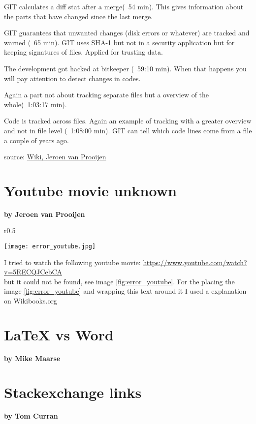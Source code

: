 GIT calculates a diff stat after a merge(~54 min). This gives information about the parts 
that have changed since the last merge.

GIT guarantees that unwanted changes (disk errors or whatever) are tracked and warned 
(~65 min). GIT uses SHA-1 but not in a security application but for keeping signatures of 
files. Applied for trusting data.

The development got hacked at bitkeeper (~59:10 min). When that happens you will pay 
attention to detect changes in codes.

Again a part not about tracking separate files but a overview of the whole(~1:03:17 min).

Code is tracked across files. Again an example of tracking with a greater overview and not 
in file level (~1:08:00 min). GIT can tell which code lines come from a file a couple of 
years ago.

source: \href{https://www.os3.nl/2015-2016/students/jeroen_van_prooijen/es/week39#youtube}{Wiki, Jeroen van Prooijen}




\section{Youtube movie unknown}
\textbf{by Jeroen van Prooijen}\\

\begin{wrapfigure}{r}{0.5\textwidth}
 \vspace{-20pt}
 \begin{center}
  \texttt{[image: error\_youtube.jpg]}
 \end{center}
 \vspace{-20pt}
 \caption{screenshot youtube error}
 \vspace{-10pt}
\label{fig:error_youtube}
\end{wrapfigure}

I tried to watch the following youtube movie: \url{https://www.youtube.com/watch?v=5RECQJCebCA}\\
but it could not be found, see image \ref{fig:error_youtube}. For the placing the image \ref{fig:error_youtube} and wrapping this
text around it I used a explanation on Wikibooks.org\cite{wikibooks_figures}

\newpage

\section{LaTeX vs Word}
\textbf{by Mike Maarse}\\

\section{Stackexchange links}
\textbf{by Tom Curran}\\


